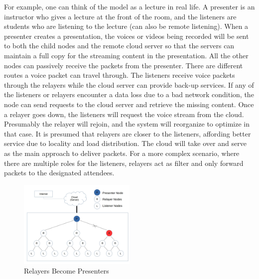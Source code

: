 For example, one can think of the model as a lecture in real life. A presenter 
is an instructor who gives a lecture at the front of the room, and the 
listeners are 
students who are listening to the lecture (can also be remote listening). When 
a 
presenter creates a presentation, the voices or videos being recorded will be 
sent to both the child nodes and the remote cloud server so that the servers can 
maintain a full copy for the streaming content in the presentation. All the 
other nodes can passively receive the packets from the presenter.
There are different routes a voice packet can travel through. The 
listeners receive voice packets through the relayers while the cloud server 
can provide back-up services. If any of the listeners or relayers encounter a 
data loss due to a bad network condition, the node can send requests to the 
cloud server and retrieve the missing content. Once a relayer goes down, 
the listeners will request the voice stream from the cloud. Presumably the 
relayer will rejoin, and the system will reorganize to optimize in that case.  
It is presumed that relayers are closer to the listeners, affording better 
service due to locality and load distribution. The cloud will take 
over 
and serve as the main approach to deliver packets. 
For a more complex scenario, where there are multiple roles for the listeners, 
relayers act as filter and only forward packets to the designated attendees. 

\begin{figure}[h!]  
  \centering
      \includegraphics[width=0.5\textwidth]{figures/model2_test2.jpg}
  \caption{Relayers Become Presenters}
  \label{fig:mod2}
\end{figure}

